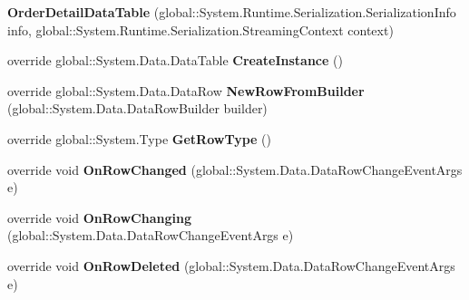 \begin{DoxyCompactItemize}
\item 
{\bfseries Order\+Detail\+Data\+Table} (global\+::\+System.\+Runtime.\+Serialization.\+Serialization\+Info info, global\+::\+System.\+Runtime.\+Serialization.\+Streaming\+Context context)\hypertarget{class_products_1_1_data_1_1ds_sage_1_1_order_detail_data_table_a19611020fcaf1f0483afd7905b3620d2}{}\label{class_products_1_1_data_1_1ds_sage_1_1_order_detail_data_table_a19611020fcaf1f0483afd7905b3620d2}

\item 
override global\+::\+System.\+Data.\+Data\+Table {\bfseries Create\+Instance} ()\hypertarget{class_products_1_1_data_1_1ds_sage_1_1_order_detail_data_table_a8afe769ae5504e6bb8e1ff2a4d626abf}{}\label{class_products_1_1_data_1_1ds_sage_1_1_order_detail_data_table_a8afe769ae5504e6bb8e1ff2a4d626abf}

\item 
override global\+::\+System.\+Data.\+Data\+Row {\bfseries New\+Row\+From\+Builder} (global\+::\+System.\+Data.\+Data\+Row\+Builder builder)\hypertarget{class_products_1_1_data_1_1ds_sage_1_1_order_detail_data_table_a875e37e3f99a597f3a9900b546f4178f}{}\label{class_products_1_1_data_1_1ds_sage_1_1_order_detail_data_table_a875e37e3f99a597f3a9900b546f4178f}

\item 
override global\+::\+System.\+Type {\bfseries Get\+Row\+Type} ()\hypertarget{class_products_1_1_data_1_1ds_sage_1_1_order_detail_data_table_ac746d8d10cf8c9eba98ad14ba1675682}{}\label{class_products_1_1_data_1_1ds_sage_1_1_order_detail_data_table_ac746d8d10cf8c9eba98ad14ba1675682}

\item 
override void {\bfseries On\+Row\+Changed} (global\+::\+System.\+Data.\+Data\+Row\+Change\+Event\+Args e)\hypertarget{class_products_1_1_data_1_1ds_sage_1_1_order_detail_data_table_ad27ad7ba9c3364e5c14a8a2a767b0f8d}{}\label{class_products_1_1_data_1_1ds_sage_1_1_order_detail_data_table_ad27ad7ba9c3364e5c14a8a2a767b0f8d}

\item 
override void {\bfseries On\+Row\+Changing} (global\+::\+System.\+Data.\+Data\+Row\+Change\+Event\+Args e)\hypertarget{class_products_1_1_data_1_1ds_sage_1_1_order_detail_data_table_a795baeab618b521cbffb151400cf85e9}{}\label{class_products_1_1_data_1_1ds_sage_1_1_order_detail_data_table_a795baeab618b521cbffb151400cf85e9}

\item 
override void {\bfseries On\+Row\+Deleted} (global\+::\+System.\+Data.\+Data\+Row\+Change\+Event\+Args e)\hypertarget{class_products_1_1_data_1_1ds_sage_1_1_order_detail_data_table_ab57c14597ea7475bbe2f15e727f91060}{}\label{class_products_1_1_data_1_1ds_sage_1_1_order_detail_data_table_ab57c14597ea7475bbe2f15e727f91060}


\end{DoxyCompactItemize}
